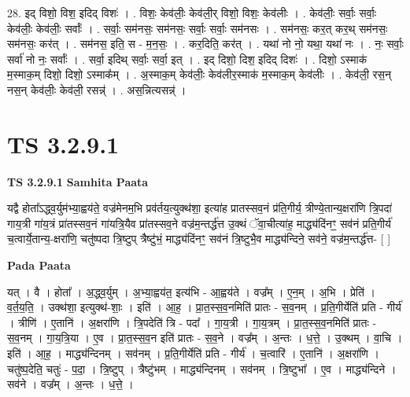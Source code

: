 \documentclass[17pt]{extarticle}
\begin{document}
28. इद् विशो॒ विश॒ इदिद् विशः॑ । . विशः॒ केव॑लीः॒ केव॑ली॒र् विशो॒ विशः॒ केव॑लीः । . केव॑लीः॒ सर्वाः॒ सर्वाः॒ केव॑लीः॒ केव॑लीः॒ सर्वाः᳚ । . सर्वाः॒ सम॑नसः॒ सम॑नसः॒ सर्वाः॒ सर्वाः॒ सम॑नसः । . सम॑नसः॒ कर॒त् कर॒थ् सम॑नसः॒ सम॑नसः॒ कर॑त् । . सम॑नस॒ इति॒ स - म॒न॒सः॒ । . कर॒दिति॒ कर॑त् । . यथा॑ नो नो॒ यथा॒ यथा॑ नः । . नः॒ सर्वाः॒ सर्वा॑ नो नः॒ सर्वाः᳚ । . सर्वा॒ इदिथ् सर्वाः॒ सर्वा॒ इत् । . इद् दिशो॒ दिश॒ इदिद् दिशः॑ । . दिशो॒ ऽस्माक॑ म॒स्माक॒म् दिशो॒ दिशो॒ ऽस्माक᳚म् । . अ॒स्माक॒म् केव॑लीः॒ केव॑लीर॒स्माक॑ म॒स्माक॒म् केव॑लीः । . केव॑ली॒ रस॒न् नस॒न् केव॑लीः॒ केव॑ली॒ रसन्न्॑ । . अस॒न्नित्यसन्न्॑ । \newline


\section{ TS 3.2.9.1 }

\textbf{TS 3.2.9.1 } \newline
\textbf{Samhita Paata} \newline

यद्वै होता᳚ऽद्ध्व॒र्युम॑भ्या॒ह्वय॑ते॒ वज्र॑मेनम॒भि प्रव॑र्तय॒त्युक्थ॑शा॒ इत्या॑ह प्रातस्सव॒नं प्र॑ति॒गीर्य॒ त्रीण्ये॒तान्य॒क्षरा॑णि त्रि॒पदा॑ गाय॒त्री गा॑य॒त्रं प्रा॑तस्सव॒नं गा॑यत्रि॒यैव प्रा॑तस्सव॒ने वज्र॑म॒न्तर्द्ध॑त्त उ॒क्थं ॅवा॒चीत्या॑ह॒ माद्ध्य॑दिंनꣳ॒॒ सव॑नं प्रति॒गीर्य॑ च॒त्वार्ये॒तान्य॒-क्षरा॑णि॒ चतु॑ष्पदा त्रि॒ष्टुप् त्रैष्टु॑भं॒ माद्ध्य॑दिंनꣳ॒॒ सव॑नं त्रि॒ष्टुभै॒व माद्ध्य॑न्दिने॒ सव॑ने॒ वज्र॑म॒न्तर्द्ध॑त्त-  [  ] \newline

\textbf{Pada Paata} \newline

यत् । वै । होता᳚ । अ॒द्ध्व॒र्युम् । अ॒भ्या॒ह्वय॑त॒ इत्य॑भि - आ॒ह्वय॑ते । वज्र᳚म् । ए॒न॒म् । अ॒भि । प्रेति॑ । व॒र्त॒य॒ति॒ । उक्थ॑शा॒ इत्युक्थ॑-शाः॒ । इति॑ । आ॒ह॒ । प्रा॒त॒स्स॒व॒नमिति॑ प्रातः - स॒व॒नम् । प्र॒ति॒गीर्येति॑ प्रति - गीर्य॑ । त्रीणि॑ । ए॒तानि॑ । अ॒क्षरा॑णि । त्रि॒पदेति॑ त्रि - पदा᳚ । गा॒य॒त्री । गा॒य॒त्रम् । प्रा॒त॒स्स॒व॒नमिति॑ प्रातः - स॒व॒नम् । गा॒य॒त्रि॒या । ए॒व । प्रा॒त॒स्स॒व॒न इति॑ प्रातः - स॒व॒ने । वज्र᳚म् । अ॒न्तः । ध॒त्ते॒ । उ॒क्थम् । वा॒चि । इति॑ । आ॒ह॒ । माद्ध्य॑न्दिनम् । सव॑नम् । प्र॒ति॒गीर्येति॑ प्रति - गीर्य॑ । च॒त्वारि॑ । ए॒तानि॑ । अ॒क्षरा॑णि । चतु॑ष्प॒देति॒ चतुः॑ - प॒दा॒ । त्रि॒ष्टुप् । त्रैष्टु॑भम् । माद्ध्य॑न्दिनम् । सव॑नम् । त्रि॒ष्टुभा᳚ । ए॒व । माद्ध्य॑न्दिने । सव॑ने । वज्र᳚म् । अ॒न्तः । ध॒त्ते॒ ।  \newline
\end{document}
